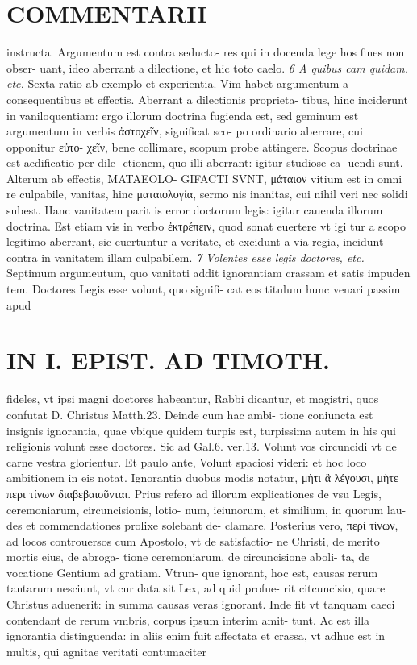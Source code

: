 \documentclass{article}
\begin{document}
\begin{pages}
\section*{COMMENTARII }
\marginpar{[ p.24 ]}\pstart instructa. Argumentum est contra seducto- res qui in docenda lege hos fines non obser- uant, ideo aberrant a dilectione, et hic toto caelo.  \pend
\textit{6 A quibus cam quidam. etc. }\pstart Sexta ratio ab exemplo et experientia. Vim habet argumentum a consequentibus et effectis. Aberrant a dilectionis proprieta- tibus, hinc inciderunt in vaniloquentiam: ergo illorum doctrina fugienda est, sed geminum est argumentum in verbis ἀστοχεῖν, significat sco- po ordinario aberrare, cui opponitur εὐτο- χεῖν, bene collimare, scopum probe attingere. Scopus doctrinae est aedificatio per dile- ctionem, quo illi aberrant: igitur studiose ca- uendi sunt. Alterum ab effectis, MATAEOLO- GIFACTI SVNT, μάταιον vitium est in omni re culpabile, vanitas, hinc ματαιολογία, sermo nis inanitas, cui nihil veri nec solidi subest. Hanc vanitatem parit is error doctorum legis: igitur cauenda illorum doctrina. Est etiam vis in verbo ἐκτρέπειν, quod sonat euertere vt igi tur a scopo legitimo aberrant, sic euertuntur a veritate, et excidunt a via regia, incidunt contra in vanitatem illam culpabilem.  \pend
\textit{7 Volentes esse legis doctores, etc. }\pstart Septimum argumeutum, quo vanitati addit ignorantiam crassam et satis impuden tem. Doctores Legis esse volunt, quo signifi- cat eos titulum hunc venari passim apud  \pend
\section*{IN I. EPIST. AD TIMOTH. }
\marginpar{[ p.25 ]}\pstart fideles, vt ipsi magni doctores habeantur, Rabbi dicantur, et magistri, quos confutat D. Christus Matth.23. Deinde cum hac ambi- tione coniuncta est insignis ignorantia, quae vbique quidem turpis est, turpissima autem in his qui religionis volunt esse doctores. Sic ad Gal.6. ver.13. Volunt vos circuncidi vt de carne vestra glorientur. Et paulo ante, Volunt spaciosi videri: et hoc loco ambitionem in eis notat. Ignorantia duobus modis notatur, μὴτι ἂ λέγουσι, μὴτε περι τίνων διαβεβαιοῦνται. Prius refero ad illorum explicationes de vsu Legis, ceremoniarum, circuncisionis, lotio- num, ieiunorum, et similium, in quorum lau- des et commendationes prolixe solebant de- clamare. Posterius vero, περὶ τίνων, ad locos controuersos cum Apostolo, vt de satisfactio- ne Christi, de merito mortis eius, de abroga- tione ceremoniarum, de circuncisione aboli- ta, de vocatione Gentium ad gratiam. Vtrun- que ignorant, hoc est, causas rerum tantarum nesciunt, vt cur data sit Lex, ad quid profue- rit citcuncisio, quare Christus aduenerit: in summa causas veras ignorant.  \pend\pstart Inde fit vt tanquam caeci contendant de rerum vmbris, corpus ipsum interim amit- tunt. Ac est illa ignorantia distinguenda: in aliis enim fuit affectata et crassa, vt adhuc est in multis, qui agnitae veritati contumaciter  \pend
\marginpar{[ p.26 ]}

\end{pages}
\end{document}
